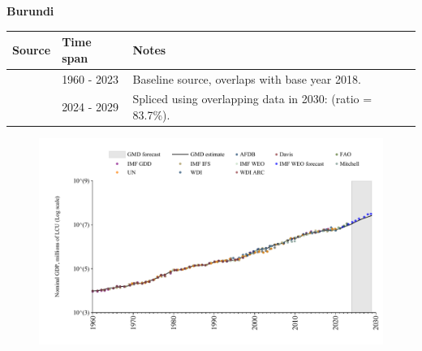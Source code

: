 \documentclass[12pt,a4paper,landscape]{article}
\begin{document}
\begin{adjustbox}{max totalsize={\paperwidth}{\paperheight},center}
\begin{minipage}[t][\textheight][t]{\textwidth}
\vspace*{0.5cm}
{}
\begin{center}
{\Large\bfseries Burundi}
\end{center}
\vspace{0.5cm}
\begin{table}[H]
\centering
\small
\begin{tabular}{|l|l|l|}
\hline
\textbf{Source} & \textbf{Time span} & \textbf{Notes} \\
\hline
\rowcolor{white}\cite{WDI}& 1960 - 2023 &Baseline source, overlaps with base year 2018.\\
\rowcolor{lightgray}\cite{IMF_WEO_forecast}& 2024 - 2029 &Spliced using overlapping data in 2030: (ratio = 83.7\%).\\
\hline
\end{tabular}
\end{table}
\begin{figure}[H]
\centering
\includegraphics[width=\textwidth,height=0.6\textheight,keepaspectratio]{graphs/BDI_nGDP.pdf}
\end{figure}
\end{minipage}
\end{adjustbox}
\end{document}
